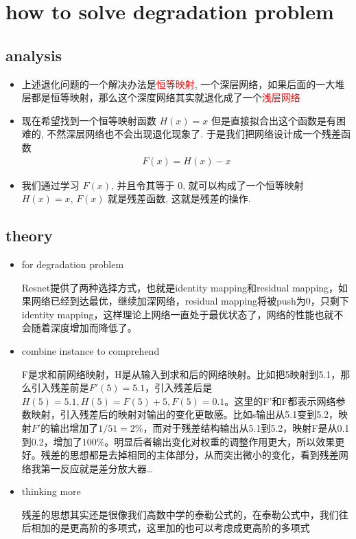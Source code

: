 \documentclass[12pt]{ctexart}%
\begin{document}
	\section{\quad how to solve degradation problem}
		\subsection{\quad analysis}
			\begin{itemize}
				\item 上述退化问题的一个解决办法是\textcolor{red}{恒等映射}, 一个深层网络，如果后面的一大堆层都是恒等映射，那么这个深度网络其实就退化成了一个\textcolor{red}{浅层网络}
				
				\item 现在希望找到一个恒等映射函数 $H(x) = x$ 但是直接拟合出这个函数是有困难的, 不然深层网络也不会出现退化现象了. 于是我们把网络设计成一个残差函数
					\begin{align}
						F(x) = H(x) - x
					\end{align}
					
				\item 我们通过学习 $F(x)$, 并且令其等于 0, 就可以构成了一个恒等映射 $H(x) = x$, $F(x)$ 就是残差函数, 这就是残差的操作. 
			\end{itemize}

		\subsection{\quad theory}
			\begin{itemize}
				\item for degradation problem
				
					\qquad Resnet提供了两种选择方式，也就是identity mapping和residual mapping，如果网络已经到达最优，继续加深网络，residual mapping将被push为0，只剩下identity mapping，这样理论上网络一直处于最优状态了，网络的性能也就不会随着深度增加而降低了。

				\item combine instance to comprehend
					
					\qquad F是求和前网络映射，H是从输入到求和后的网络映射。比如把5映射到5.1，那么引入残差前是$F'(5)=5.1$，引入残差后是$H(5)=5.1, H(5)=F(5)+5, F(5)=0.1$。这里的F’和F都表示网络参数映射，引入残差后的映射对输出的变化更敏感。比如s输出从5.1变到5.2，映射$F'$的输出增加了$1/51=2\%$，而对于残差结构输出从5.1到5.2，映射F是从0.1到0.2，增加了$100\%$。明显后者输出变化对权重的调整作用更大，所以效果更好。残差的思想都是去掉相同的主体部分，从而突出微小的变化，看到残差网络我第一反应就是差分放大器…

				\item thinking more
				
					\qquad 残差的思想其实还是很像我们高数中学的泰勒公式的，在泰勒公式中，我们往后相加的是更高阶的多项式，这里加的也可以考虑成更高阶的多项式
			\end{itemize}		
		
\end{document}

